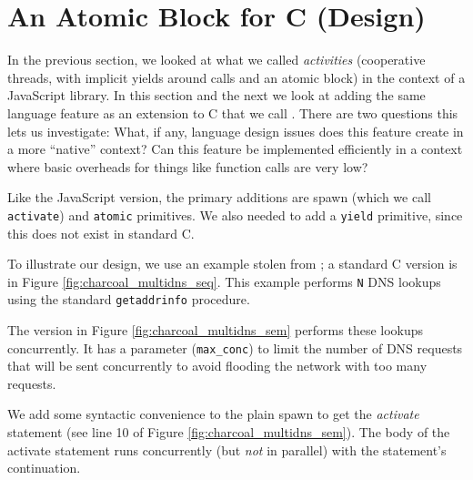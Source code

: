 \documentclass[acmsmall,anonymous,review]{acmart}\settopmatter{printfolios=true,printccs=false,printacmref=false}
\begin{document}

\section{An Atomic Block for C (Design)}

In the previous section, we looked at what we called \emph{activities} (cooperative threads, with implicit yields around calls and an atomic block) in the context of a JavaScript library.
In this section and the next we look at adding the same language feature as an extension to C that we call \charcoal{}.
There are two questions this lets us investigate:
What, if any, language design issues does this feature create in a more ``native'' context?
Can this feature be implemented efficiently in a context where basic overheads for things like function calls are very low?

Like the JavaScript version, the primary additions are spawn (which we call \texttt{activate}) and \texttt{atomic} primitives.
We also needed to add a \texttt{yield} primitive, since this does not exist in standard C.

To illustrate our design, we use an example stolen from \cite{Krohn2007}; a standard C version is in Figure \ref{fig:charcoal_multidns_seq}.
This example performs \texttt{N} DNS lookups using the standard \texttt{getaddrinfo} procedure.

The \charcoal{} version in Figure \ref{fig:charcoal_multidns_sem} performs these lookups concurrently.
It has a parameter (\texttt{max\_conc}) to limit the number of DNS requests that will be sent concurrently to avoid flooding the network with too many requests.

We add some syntactic convenience to the plain spawn to get the \emph{activate} statement (see line 10 of Figure \ref{fig:charcoal_multidns_sem}).
The body of the activate statement runs concurrently (but \emph{not} in parallel) with the statement's continuation.
\end{document}
